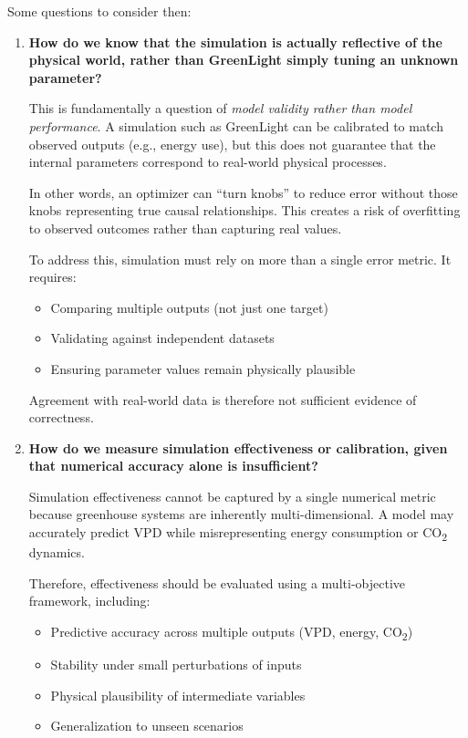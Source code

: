 \documentclass{article}
\begin{document}
Some questions to consider then:
\begin{enumerate}

    \item \textbf{How do we know that the simulation is actually reflective of the physical world, rather than GreenLight simply tuning an unknown parameter?}

    This is fundamentally a question of \emph{model validity rather than model performance}. A simulation such as GreenLight can be calibrated to match observed outputs (e.g., energy use), but this does not guarantee that the internal parameters correspond to real-world physical processes.

    In other words, an optimizer can ``turn knobs'' to reduce error without those knobs representing true causal relationships. This creates a risk of overfitting to observed outcomes rather than capturing real values.

    To address this, simulation must rely on more than a single error metric. It requires:
    \begin{itemize}
        \item Comparing multiple outputs (not just one target)
        \item Validating against independent datasets
        \item Ensuring parameter values remain physically plausible
    \end{itemize}

    Agreement with real-world data is therefore not sufficient evidence of correctness.

    \item \textbf{How do we measure simulation effectiveness or calibration, given that numerical accuracy alone is insufficient?}

    Simulation effectiveness cannot be captured by a single numerical metric because greenhouse systems are inherently multi-dimensional. A model may accurately predict VPD while misrepresenting energy consumption or CO\textsubscript{2} dynamics.

    Therefore, effectiveness should be evaluated using a multi-objective framework, including:
    \begin{itemize}
        \item Predictive accuracy across multiple outputs (VPD, energy, CO\textsubscript{2})
        \item Stability under small perturbations of inputs
        \item Physical plausibility of intermediate variables
        \item Generalization to unseen scenarios
    \end{itemize}


\end{enumerate}
\end{document}

